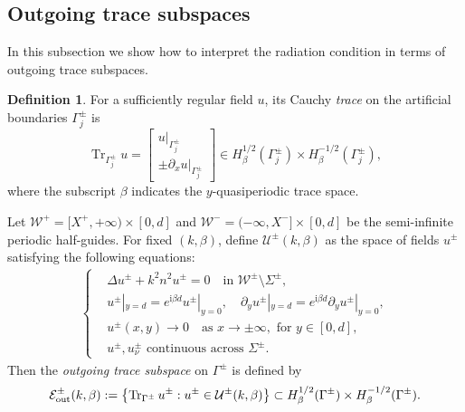 \documentclass[11pt,fleqn]{article}
\newcommand{\ii}{\mathrm{i}}
\theoremstyle{definition}
\newtheorem{definition}{Definition}
\theoremstyle{remark}
\begin{document}
\subsection{Outgoing trace subspaces}\label{sec:outgoing-trace-subspaces}
In this subsection we show how to interpret the radiation condition in terms of outgoing trace subspaces. 
\begin{definition}
  For a sufficiently regular field \(u\), its Cauchy \emph{trace} on the artificial boundaries $\Gamma^\pm_j$ is
  \[
    \operatorname{Tr}_{\Gamma^\pm_j}u
    =
    \begin{bmatrix}
      u|_{\Gamma^\pm_j}\\
      \pm \partial_x u|_{\Gamma^\pm_j}
    \end{bmatrix}
    \in
    H^{1/2}_\beta(\Gamma^\pm_j)\times H^{-1/2}_\beta(\Gamma^\pm_j),
  \]
  where the subscript \(\beta\) indicates the \(y\)-quasiperiodic trace space.
\end{definition}

Let $\mathcal{W}^+ = [X^+, +\infty) \times [0,d]$ and $\mathcal{W}^- = (-\infty, X^-] \times [0,d]$ be the semi-infinite periodic half-guides. For fixed $(k, \beta)$, define $\mathcal{U}^\pm(k,\beta)$ as the space of fields $u^\pm$ satisfying the following equations:
\begin{align*}
\begin{cases}
  &\Delta u^\pm + k^2 n^2 u^\pm = 0 \quad \text{in } \mathcal{W^\pm}\setminus \Sigma^\pm,\\
  &u^\pm|_{y = d} = e^{\ii\beta d} u^\pm|_{y = 0}, \quad \partial_y u^\pm|_{y = d} = e^{\ii\beta d} \partial_y u^\pm|_{y = 0},\\
  &u^\pm(x,y)\to 0 \quad \text{as } x\to \pm\infty,
    \text{ for } y\in[0,d],\\
  &u^\pm, u^\pm_\nu \text{ continuous across } \Sigma^\pm.
\end{cases}
\end{align*}
Then the \emph{outgoing trace subspace} on $\Gamma^\pm$ is defined by\begin{align}
  \mathcal{E}^\pm_{\rm out}(k,\beta) :=
  \left\{
    \operatorname{Tr}_{\Gamma^\pm}u^\pm :
    u^\pm\in \mathcal{U}^\pm(k,\beta)
  \right\}
  \subset H^{1/2}_\beta(\Gamma^\pm)\times H^{-1/2}_\beta(\Gamma^\pm).
\end{align}
\end{document}
